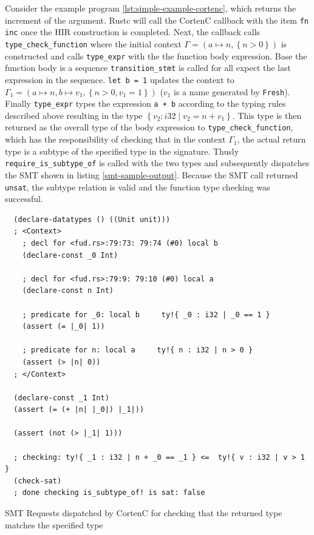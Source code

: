 \documentclass{book}
\newcommand{\code}[1]{\texttt{#1}}
\theoremstyle{definition}
\begin{document}
Consider the example program \ref{lst:simple-example-cortenc}, which returns the increment of the argument.
Rustc will call the CortenC callback with the item \code{fn inc} once the HIR construction is completed. Next, the callback calls \code{type\_check\_function} where the initial context $\Gamma = ( a \mapsto n, \left\{ n > 0\right\})$ is constructed and calls \code{type\_expr} with the the function body expression. Base the function body is a sequence \code{transition\_stmt} is called for all expect the last expression in the sequence. \code{let b = 1} updates the context to $\Gamma_1 = ( a \mapsto n, b \mapsto v_1, \left\{ n > 0, v_1 = 1\right\})$ ($v_1$ is a name generated by \code{Fresh}). 
Finally \code{type\_expr} types the expression \code{a + b} according to the typing rules described above resulting in the type $\left\{ v_2 : i32 \mid v_2 = n + v_1\right\}$.
This type is then returned as the overall type of the body expression to \code{type\_check\_function}, which has the responsibility of checking that in the context $\Gamma_1$, the actual return type is a subtype of the specified type in the signature. 
Thusly \code{require\_is\_subtype\_of} is called with the two types and subsequently dispatches the SMT shown in listing \ref{smt-sample-output}. 
Because the SMT call returned \code{unsat}, the subtype relation is valid and the function type checking was successful.


\begin{listing}[ht]
  \begin{verbatim}
  (declare-datatypes () ((Unit unit)))
  ; <Context>
    ; decl for <fud.rs>:79:73: 79:74 (#0) local b
    (declare-const _0 Int)
    
    ; decl for <fud.rs>:79:9: 79:10 (#0) local a
    (declare-const n Int)
    
    ; predicate for _0: local b     ty!{ _0 : i32 | _0 == 1 }
    (assert (= |_0| 1))
    
    ; predicate for n: local a     ty!{ n : i32 | n > 0 }
    (assert (> |n| 0))
  ; </Context>

  (declare-const _1 Int)
  (assert (= (+ |n| |_0|) |_1|))
  
  (assert (not (> |_1| 1)))
  
  ; checking: ty!{ _1 : i32 | n + _0 == _1 } <=  ty!{ v : i32 | v > 1 }
  (check-sat)
  ; done checking is_subtype_of! is sat: false
  \end{verbatim}
  \caption{SMT Requests dispatched by CortenC for checking that the returned type matches the specified type}
  \label{lst:smt-sample-output}
\end{listing}
\end{document}
